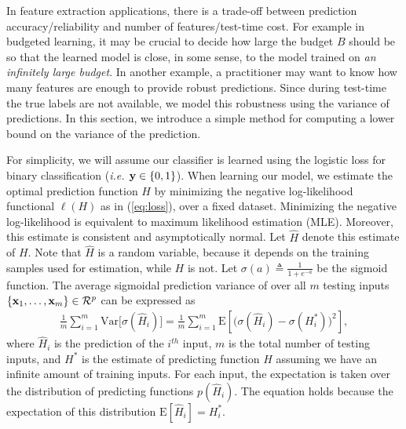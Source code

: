 In feature extraction applications, there is a trade-off between prediction accuracy/reliability and number of features/test-time cost. For example in budgeted learning, it may be crucial to decide how large the budget $B$ should be so that the learned model is close, in some sense, to the model trained on \emph{an infinitely large budget}. In another example, a practitioner may want to know how many features are enough to provide robust predictions. Since during test-time the true labels are not available, we model this robustness using the variance of predictions. In this section, we introduce a simple method for computing a lower bound on the variance of the prediction.


For simplicity, we will assume our classifier is learned using the logistic loss for binary classification (\emph{i.e. $\mathbf{y} \in \{0,1\}$}). When learning our model, we estimate the optimal prediction function $H$ by minimizing the negative log-likelihood functional $\ell(H)$ as in (\ref{eq:loss}), over a fixed dataset. %
Minimizing the negative log-likelihood is equivalent to maximum likelihood estimation (MLE). Moreover, this estimate is consistent and asymptotically normal. Let $\hat{H}$ denote this estimate of $H$. Note that $\hat{H}$ is a random variable, because it depends on the training samples used for estimation, while $H$ is not. Let $\sigma(a) \triangleq \frac{1}{1+e^{-a}}$ be the sigmoid function. The average sigmoidal prediction variance of over all $m$ testing inputs $\{\mathbf{x}_1, \dots, \mathbf{x}_m\} \in {\cal R}^p$  can be expressed as
\begin{align}
    \frac{1}{m}\sum_{i=1}^{m}\text{Var}\big[\sigma(\hat{H}_i)\big] = \frac{1}{m}\sum_{i=1}^{m}\text{E}\left[\big(\sigma(\hat{H}_i)-\sigma(H_i^*)\big)^2\right], \label{eq:totalvar}
\end{align}
where $\hat{H}_i$ is the prediction of the $i^{th}$ input, $m$ is the total number of testing inputs, and $H^*$ is the estimate of predicting function $H$ assuming we have an infinite amount of training inputs. For each input, the expectation is taken over the distribution of predicting functions $p(\hat{H}_i)$. The equation holds because the expectation of this distribution $\text{E}[\hat{H}_i] = H^*_i$.

